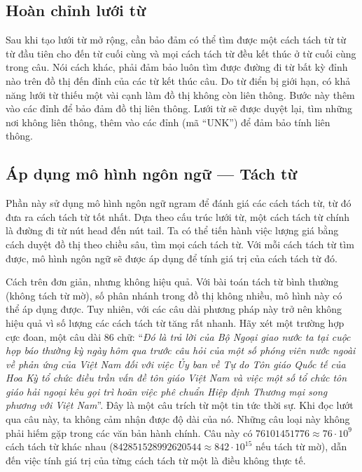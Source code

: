 \documentclass[a4paper,oneside,14pt]{extbook} %
\begin{document}
\subsection{Hoàn chỉnh lưới từ}
\label{sec:lattice:competion}

Sau khi tạo lưới từ mở rộng, cần bảo đảm có thể tìm được một cách tách
từ từ từ đầu tiên cho đến từ cuối cùng và mọi cách tách từ đều kết thúc
ở từ cuối cùng trong câu. Nói cách khác, phải đảm bảo luôn tìm được
đường đi từ bất kỳ đỉnh nào trên đồ thị đến đỉnh của các từ kết thúc câu.
Do từ điển bị giới hạn, có khả năng lưới từ thiếu một vài cạnh làm đồ
thị không còn liên thông. Bước này thêm vào các đỉnh để bảo đảm đồ thị
liên thông. Lưới từ sẽ được duyệt lại, tìm những nơi không liên thông,
thêm vào các đỉnh (mã ``UNK'') để đảm bảo tính liên thông. 

\subsection{Áp dụng mô hình ngôn ngữ --- Tách từ}

\label{sec:language-model}

Phần này sử dụng mô hình ngôn ngữ n\-gram để đánh giá các cách tách từ,
từ đó đưa ra cách tách từ tốt nhất. Dựa theo cấu trúc lưới từ, một
cách tách từ chính là đường đi từ nút head đến nút tail. Ta có thể
tiến hành việc lượng giá bằng cách duyệt đồ thị theo chiều sâu, tìm
mọi cách tách từ. Với mỗi cách tách từ tìm được, mô hình ngôn ngữ sẽ
được áp dụng để tính giá trị của cách tách từ đó.

Cách trên đơn giản, nhưng không hiệu quả. Với bài toán tách từ bình
thường (không tách từ mờ), số phân nhánh trong đồ thị không nhiều, mô
hình này có thể áp dụng được. Tuy nhiên, với các câu dài phương pháp
này trở nên không hiệu quả vì số lượng các cách tách từ tăng rất
nhanh. Hãy xét một trường hợp cực đoan, một câu dài 86 chữ: ``\textit{Đó là trả
lời của Bộ Ngoại giao nước ta tại cuộc họp báo thường kỳ ngày hôm qua trước
câu hỏi của một số phóng viên nước ngoài về phản ứng của Việt Nam đối
với việc Ủy ban về Tự do Tôn giáo Quốc tế của Hoa Kỳ tổ chức điều trần
vấn đề tôn giáo Việt Nam và việc một số tổ chức tôn giáo hải ngoại kêu
gọi trì hoãn việc phê chuẩn Hiệp định Thương mại song phương với Việt
Nam}''. Đây là một câu trích từ một tin tức thời sự. Khi đọc lướt qua câu
này, ta không cảm nhận được độ dài của nó. Những câu loại này không
phải hiếm gặp trong các văn bản hành chính. Câu này có $76101451776 \approx 76\cdot 10^9$ cách
tách từ khác nhau ($842851528992620544 \approx 842\cdot 10^{15}$ nếu tách từ mờ), dẫn đến
việc tính giá trị của từng cách tách từ một là điều không thực tế.
\end{document}
